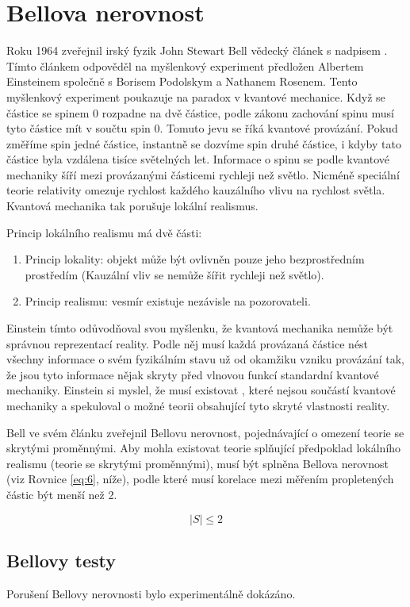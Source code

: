 \section{Bellova nerovnost}
Roku 1964 zveřejnil irský fyzik John Stewart Bell vědecký článek s nadpisem . Tímto článkem odpověděl na myšlenkový experiment předložen Albertem Einsteinem společně s Borisem Podolskym a Nathanem Rosenem. Tento myšlenkový experiment poukazuje na paradox v kvantové mechanice. Když se částice se spinem 0 rozpadne na dvě částice, podle zákonu zachování spinu musí tyto částice mít v součtu spin 0. Tomuto jevu se říká kvantové provázání. Pokud změříme spin jedné částice, instantně se dozvíme spin druhé částice, i kdyby tato částice byla vzdálena tisíce světelných let. Informace o spinu se podle kvantové mechaniky šíří mezi provázanými částicemi rychleji než světlo. Nicméně speciální teorie relativity omezuje rychlost každého kauzálního vlivu na rychlost světla. Kvantová mechanika tak porušuje lokální realismus.

    Princip lokálního realismu má dvě části:
    \begin{enumerate}
        \item Princip lokality: objekt může být ovlivněn pouze jeho bezprostředním prostředím (Kauzální vliv se nemůže šířit rychleji než světlo). \parencite{lokalita}
        \item Princip realismu: vesmír existuje nezávisle na pozorovateli. \parencite{realismus}
    \end{enumerate}
    
    Einstein tímto odůvodňoval svou myšlenku, že kvantová mechanika nemůže být správnou reprezentací reality. Podle něj musí každá provázaná částice nést všechny informace o svém fyzikálním stavu už od okamžiku vzniku provázání tak, že jsou tyto informace nějak skryty před vlnovou funkcí standardní kvantové mechaniky. Einstein si myslel, že musí existovat , které nejsou součástí kvantové mechaniky a spekuloval o možné teorii obsahující tyto skryté vlastnosti reality.

Bell ve svém článku zveřejnil Bellovu nerovnost, pojednávající o omezení teorie se skrytými proměnnými. Aby mohla existovat teorie splňující předpoklad lokálního realismu (teorie se skrytými proměnnými), musí být splněna Bellova nerovnost (viz Rovnice \ref{eq:6}, níže), podle které musí korelace mezi měřením propletených částic být menší než 2.

\begin{equation}
    |S| \leq 2
    \label{eq:6}
\end{equation}

\subsection{Bellovy testy}
Porušení Bellovy nerovnosti bylo experimentálně dokázáno. 